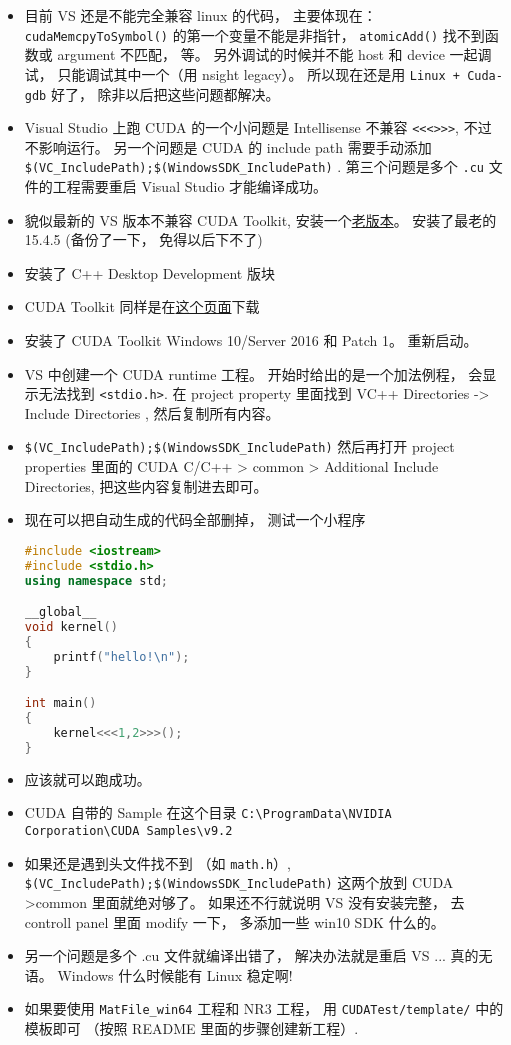 

\begin{itemize}
\item 目前 VS 还是不能完全兼容 linux 的代码， 主要体现在： \verb`cudaMemcpyToSymbol()` 的第一个变量不能是非指针， \verb`atomicAdd()` 找不到函数或 argument 不匹配， 等。 另外调试的时候并不能 host 和 device 一起调试， 只能调试其中一个（用 nsight legacy）。 所以现在还是用 \verb`Linux + Cuda-gdb` 好了， 除非以后把这些问题都解决。
\item Visual Studio 上跑 CUDA 的一个小问题是 Intellisense 不兼容 \verb`<<<>>>`, 不过不影响运行。 另一个问题是 CUDA 的 include path 需要手动添加 \verb`$(VC_IncludePath);$(WindowsSDK_IncludePath)` . 第三个问题是多个 \verb`.cu` 文件的工程需要重启 Visual Studio 才能编译成功。
\item 貌似最新的 VS 版本不兼容 CUDA Toolkit, 安装一个\href{https://docs.microsoft.com/en-us/visualstudio/productinfo/installing-an-earlier-release-of-vs2017}{老版本}。 安装了最老的 15.4.5 (备份了一下， 免得以后下不了)
\item 安装了 C++ Desktop Development 版块
\item CUDA Toolkit 同样是在\href{https://developer.nvidia.com/cuda-downloads}{这个页面}下载
\item 安装了 CUDA Toolkit Windows 10/Server 2016 和 Patch 1。 重新启动。
\item VS 中创建一个 CUDA runtime 工程。 开始时给出的是一个加法例程， 会显示无法找到 \verb`<stdio.h>`. 在 project property 里面找到 VC++ Directories -> Include Directories , 然后复制所有内容。
\item \verb`$(VC_IncludePath);$(WindowsSDK_IncludePath)` 然后再打开 project properties 里面的 CUDA C/C++ >  common > Additional Include Directories, 把这些内容复制进去即可。
\item 现在可以把自动生成的代码全部删掉， 测试一个小程序
\begin{lstlisting}[language=cpp]
#include <iostream>
#include <stdio.h>
using namespace std;

__global__
void kernel()
{
	printf("hello!\n");
}

int main()
{
	kernel<<<1,2>>>();
}
\end{lstlisting}
\item 应该就可以跑成功。
\item CUDA 自带的 Sample 在这个目录 \verb`C:\ProgramData\NVIDIA Corporation\CUDA Samples\v9.2`
\item 如果还是遇到头文件找不到 （如 \verb`math.h`）, \verb`$(VC_IncludePath);$(WindowsSDK_IncludePath)` 这两个放到 CUDA >common 里面就绝对够了。 如果还不行就说明 VS 没有安装完整， 去 controll panel 里面 modify 一下， 多添加一些 win10 SDK 什么的。
\item 另一个问题是多个 .cu 文件就编译出错了， 解决办法就是重启 VS ... 真的无语。 Windows 什么时候能有 Linux 稳定啊!
\item 如果要使用 \verb`MatFile_win64` 工程和 NR3 工程， 用 \verb`CUDATest/template/` 中的模板即可 （按照 README 里面的步骤创建新工程）.
\end{itemize}
